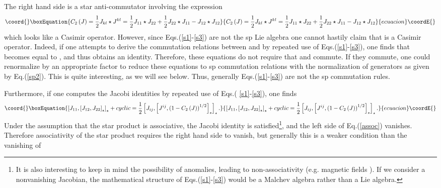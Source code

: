\documentclass[a4paper,12pt]{article}
\begin{document}
The right hand side is a star anti-commutator involving the expression 
\begin{equation}\coord{}\boxEquation{
C_{2}\left( J\right) =\frac{1}{2}J_{kl}\star J^{kl}=\frac{1}{2}J_{11}\star
J_{22}+\frac{1}{2}J_{22}\star J_{11}-J_{12}\star J_{12}
}{
C_{2}\left( J\right) =\frac{1}{2}J_{kl}\star J^{kl}=\frac{1}{2}J_{11}\star
J_{22}+\frac{1}{2}J_{22}\star J_{11}-J_{12}\star J_{12}
}{ecuacion}\coordE{}\end{equation}
which looks like a Casimir operator. However, since Eqs.(\ref{s1}-\ref{s3})
are not the sp\coordHE{} Lie algebra one cannot hastily claim that 
\coordHE{} is a Casimir operator. Indeed, if one attempts to
derive the commutation relations between \coordHE{} and \coordHE{}
by repeated use of Eqs.(\ref{s1}-\ref{s3}), one finds that \coordHE{} becomes equal to \coordHE{}, and thus obtains an identity. Therefore, these equations do
not require that \coordHE{} and \coordHE{} commute. If they
commute, one could renormalize \coordHE{} by an appropriate factor to reduce
these equations to sp\coordHE{} commutation relations with the
normalization of generators as given by Eq.(\ref{sp2}). This is quite
interesting, as we will see below. Thus, generally Eqs.(\ref{s1}-\ref{s3})
are not the sp\coordHE{} commutation rules.

Furthermore, if one computes the Jacobi identities by repeated use of Eqs.(%
\ref{s1}-\ref{s3}), one finds 
\begin{equation}\coord{}\boxEquation{
\left[ J_{11},\left[ J_{12},J_{22}\right] _{\star }\right] _{\star }+cyclic=
\frac{1}{2}\left[ J_{ij},\left[ J^{ij},\left( 1-C_{2}\left( J\right) \right)
^{1/2}\right] _{\star }\right] _{\star }.  \label{assoc}
}{
\left[ J_{11},\left[ J_{12},J_{22}\right] _{\star }\right] _{\star }+cyclic=
\frac{1}{2}\left[ J_{ij},\left[ J^{ij},\left( 1-C_{2}\left( J\right) \right)
^{1/2}\right] _{\star }\right] _{\star }.  }{ecuacion}\coordE{}\end{equation}
Under the assumption that the star product is associative, the Jacobi
identity is satisfied\footnote{%
It is also interesting to keep in mind the possibility of anomalies, leading
to non-associativity (e.g. magnetic fields \cite{zumino}). If we consider a
nonvanishing Jacobian, the mathematical structure of Eqs.(\ref{s1}-\ref{s3})
would be a Malchev algebra rather than a Lie algebra.}, and the left side of
Eq.(\ref{assoc}) vanishes. Therefore associativity of the star product
requires the right hand side to vanish, but generally this is a weaker
condition than the vanishing of \coordHE{}
\end{document}
